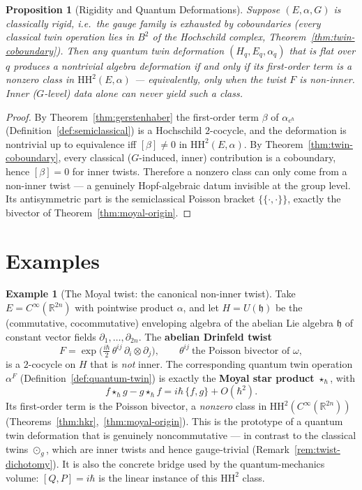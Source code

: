 \documentclass[11pt,a4paper,openany]{book}
\theoremstyle{plain}
\newtheorem{proposition}[theorem]{Proposition}
\theoremstyle{definition}
\newtheorem{example}[theorem]{Example}
\newcommand{\twing}[1]{\odot_{#1}}
\newcommand{\actspace}{E}
\newcommand{\groupG}{G}
\newcommand{\RR}{\mathbb{R}}
\begin{document}
\begin{proposition}[Rigidity and Quantum Deformations]\label{prop:quantum-rigidity}
Suppose $(\actspace, \alpha, \groupG)$ is classically rigid, i.e.\ the gauge family is exhausted by coboundaries (every classical twin operation lies in $B^2$ of the Hochschild complex, Theorem~\ref{thm:twin-coboundary}). Then any quantum twin deformation $(H_q, \actspace_q, \alpha_q)$ that is flat over $q$ produces a nontrivial algebra deformation \emph{if and only if} its first-order term is a nonzero class in $\mathrm{HH}^2(\actspace,\alpha)$ --- equivalently, only when the twist $F$ is non-inner. Inner ($\groupG$-level) data alone can never yield such a class.
\end{proposition}

\begin{proof}
By Theorem~\ref{thm:gerstenhaber} the first-order term $\beta$ of $\alpha_{e^\hbar}$ (Definition~\ref{def:semiclassical}) is a Hochschild $2$-cocycle, and the deformation is nontrivial up to equivalence iff $[\beta]\neq 0$ in $\mathrm{HH}^2(\actspace,\alpha)$. By Theorem~\ref{thm:twin-coboundary}, every classical ($\groupG$-induced, inner) contribution is a coboundary, hence $[\beta]=0$ for inner twists. Therefore a nonzero class can only come from a non-inner twist --- a genuinely Hopf-algebraic datum invisible at the group level. Its antisymmetric part is the semiclassical Poisson bracket $\{\!\{{\cdot},{\cdot}\}\!\}$, exactly the bivector of Theorem~\ref{thm:moyal-origin}.
\end{proof}

\section{Examples}

\begin{example}[The Moyal twist: the canonical non-inner twist]\label{ex:moyal-twist}
Take $\actspace = C^\infty(\RR^{2n})$ with pointwise product $\alpha$, and let $H = U(\mathfrak{h})$ be the (commutative, cocommutative) enveloping algebra of the abelian Lie algebra $\mathfrak{h}$ of constant vector fields $\partial_1,\dots,\partial_{2n}$. The \textbf{abelian Drinfeld twist}
\[
F = \exp\!\Big(\tfrac{i\hbar}{2}\,\theta^{ij}\,\partial_i \otimes \partial_j\Big), \qquad \theta^{ij}\ \text{the Poisson bivector of }\omega,
\]
is a $2$-cocycle on $H$ that is \emph{not} inner. The corresponding quantum twin operation $\alpha^F$ (Definition~\ref{def:quantum-twin}) is exactly the \textbf{Moyal star product} $\star_\hbar$, with
\[
f \star_\hbar g - g \star_\hbar f = i\hbar\,\{f,g\} + O(\hbar^2).
\]
Its first-order term is the Poisson bivector, a \emph{nonzero} class in $\mathrm{HH}^2(C^\infty(\RR^{2n}))$ (Theorems~\ref{thm:hkr},~\ref{thm:moyal-origin}). This is the prototype of a quantum twin deformation that is genuinely noncommutative --- in contrast to the classical twins $\twing{g}$, which are inner twists and hence gauge-trivial (Remark~\ref{rem:twist-dichotomy}). It is also the concrete bridge used by the quantum-mechanics volume: $[Q,P]=i\hbar$ is the linear instance of this $\mathrm{HH}^2$ class.
\end{example}
\end{document}
